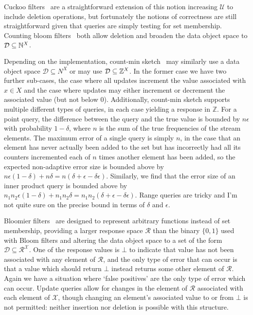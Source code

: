 Cuckoo filters~\cite{xxx} are a straightforward extension of this notion increasing $\mathcal{U}$ to include deletion operations, but fortunately the notions of correctness are still straightforward given that queries are simply testing for set membership. Counting bloom filters~\cite{xxx} both allow deletion and broaden the data object space to $\mathcal{D} \subseteq \mathbb{N}^X$.

Depending on the implementation, count-min sketch~\cite{xxx} may similarly use a data object space $\mathcal{D} \subseteq N^X$ or may use $\mathcal{D} \subseteq \mathbb{Z}^X$. In the former case we have two further sub-cases, the case where all updates increment the value associated with $x \in X$ and the case where updates may either increment or decrement the associated value (but not below 0). Additionally, count-min sketch supports multiple different types of queries, in each case yielding a response in $\mathbb{Z}$. For a point query, the difference between the query and the true value is bounded by $n\epsilon$ with probability $1-\delta$, where $n$ is the sum of the true frequencies of the stream elements. The maximum error of a single query is simply $n$, in the case that an element has never actually been added to the set but has incorrectly had all its counters incremented each of $n$ times another element has been added, so the expected non-adaptive error size is bounded above by $n\epsilon(1-\delta)+n\delta = n(\delta+\epsilon-\delta\epsilon)$.  Similarly, we find that the error size of an inner product query is bounded above by $n_1n_2\epsilon(1-\delta)+n_1n_2\delta = n_1n_2(\delta+\epsilon-\delta\epsilon)$. Range queries are tricky and I'm not quite sure on the precise bound in terms of $\delta$ and $\epsilon$.

Bloomier filters~\cite{xxx} are designed to represent arbitrary functions instead of set membership, providing a larger response space $\mathcal{R}$ than the binary $\{0,1\}$ used with Bloom filters and altering the data object space to a set of the form $\mathcal{D} \subseteq \mathcal{R}^\mathcal{X}$. One of the response values is $\bot$ to indicate that value has not been associated with any element of $\mathcal{R}$, and the only type of error that can occur is that a value which should return $\bot$ instead returns some other element of $\mathcal{R}$. Again we have a situation where `false positives' are the only type of error which can occur. Update queries allow for changes in the element of $\mathcal{R}$ associated with each element of $\mathcal{X}$, though changing an element's associated value to or from $\bot$ is not permitted: neither insertion nor deletion is possible with this structure.

